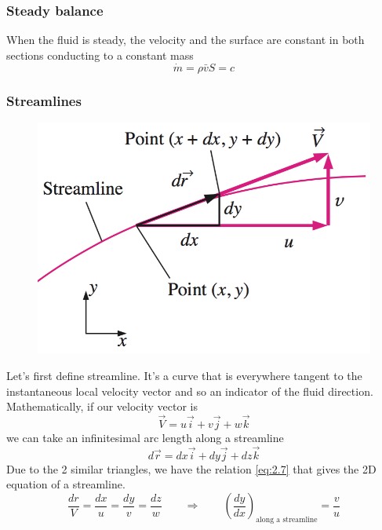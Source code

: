 		\subsubsection{Steady balance}
			When the fluid is steady, the velocity and the surface are constant in both sections conducting to a constant mass
			\begin{equation}
				\dot{m} = \rho \bar{v}S = c
				\label{eq:2.4}
			\end{equation}

		\subsubsection{Streamlines}
			\begin{figure}
			\vspace{-5mm}
			\includegraphics[scale=0.35]{ch2/2}
			\end{figure}
			Let's first define streamline. It's a curve that is everywhere tangent to the instantaneous local velocity vector and so an indicator of the fluid direction. 
			Mathematically, if our velocity vector is 
			\begin{equation}
				\vec{V} = u\vec{i}+v\vec{j}+w\vec{k}
			\end{equation}
			we can take an infinitesimal arc length along a streamline 
			\begin{equation}
				d\vec{r} = dx\vec{i}+dy\vec{j}+dz\vec{k}
			\end{equation}
			Due to the 2 similar triangles, we have the relation \autoref{eq:2.7} that gives the 2D equation of a streamline.
			\begin{equation}
				\frac{dr}{V} = \frac{dx}{u} = \frac{dy}{v} = \frac{dz}{w} \qquad
				 \Rightarrow \qquad
				 \left(\frac{dy}{dx}\right)_{\mbox{along a streamline}} = \frac{v}{u}
				\label{eq:2.7}
			\end{equation}
			
